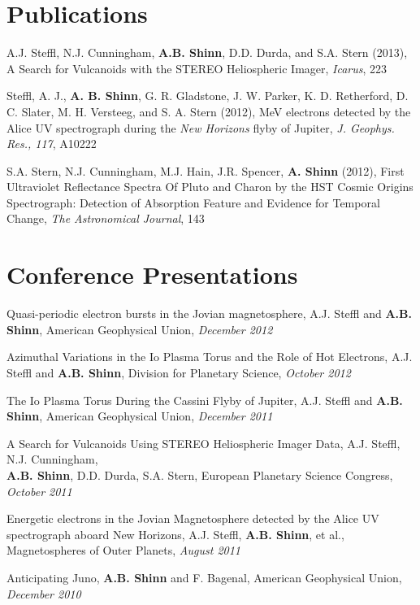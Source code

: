 \documentclass[margin,line]{res}
\begin{document}
\begin{resume}
\section{\sc Publications}

A.J. Steffl, N.J. Cunningham, {\bf A.B. Shinn}, D.D. Durda, and S.A. Stern (2013), A Search for Vulcanoids with the STEREO Heliospheric Imager, {\em Icarus}, 223

Steffl, A. J., {\bf A. B. Shinn}, G. R. Gladstone, J. W. Parker, K. D. Retherford, D. C. Slater, M. H. Versteeg, and S. A. Stern (2012), MeV electrons detected by the Alice UV spectrograph during the {\em New Horizons} flyby of Jupiter, {\em J. Geophys. Res., 117}, A10222%

S.A. Stern, N.J. Cunningham, M.J. Hain, J.R. Spencer, {\bf A. Shinn} (2012), First Ultraviolet Reflectance Spectra Of Pluto and Charon by the HST Cosmic Origins Spectrograph: Detection of Absorption Feature and Evidence for Temporal Change, {\em The Astronomical Journal}, 143


\section{\sc Conference Presentations}

Quasi-periodic electron bursts in the Jovian magnetosphere, A.J. Steffl and {\bf A.B. Shinn}, American Geophysical Union, {\it December 2012}

Azimuthal Variations in the Io Plasma Torus and the Role of Hot Electrons, A.J. Steffl and {\bf A.B. Shinn}, Division for Planetary Science, {\it October 2012}

The Io Plasma Torus During the Cassini Flyby of Jupiter, A.J. Steffl and {\bf A.B. Shinn}, American Geophysical Union, {\it December 2011}

A Search for Vulcanoids Using STEREO Heliospheric Imager Data, A.J. Steffl, N.J. Cunningham, \\
{\bf A.B. Shinn}, D.D. Durda, S.A. Stern, European Planetary Science Congress, {\it October 2011}

Energetic electrons in the Jovian Magnetosphere detected by the Alice UV spectrograph aboard New Horizons, A.J. Steffl, {\bf A.B. Shinn}, et al., Magnetospheres of Outer Planets, {\it August 2011}

Anticipating Juno, {\bf A.B. Shinn} and F. Bagenal, American Geophysical Union, {\it December 2010}



\end{resume}
\end{document}
